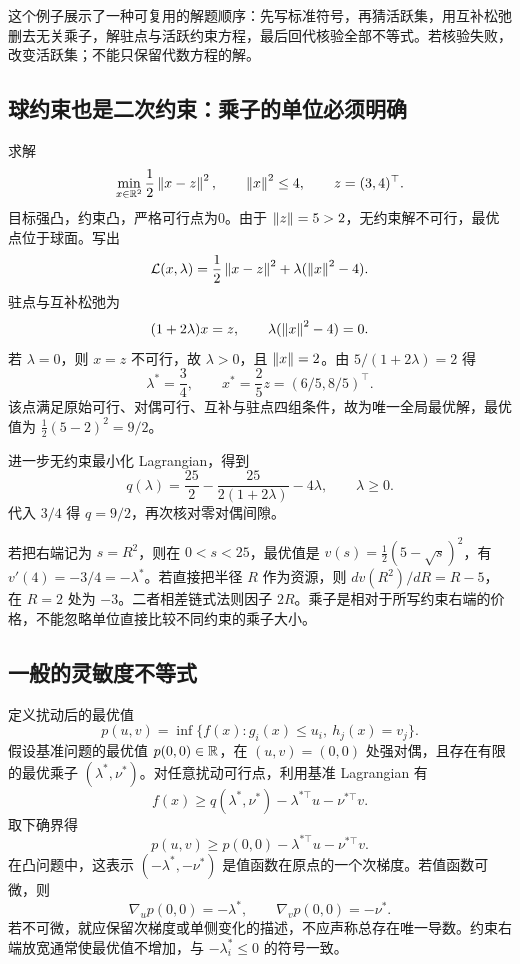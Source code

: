 这个例子展示了一种可复用的解题顺序：先写标准符号，再猜活跃集，用互补松弛删去无关乘子，解驻点与活跃约束方程，最后回代核验全部不等式。若核验失败，改变活跃集；不能只保留代数方程的解。

\subsection{球约束也是二次约束：乘子的单位必须明确}

\begin{example}
\label{l2:ex-ball}
求解
\[
 \min_{x\in\mathbb R^2}\frac12\left\lVert x-z\right\rVert^2,
 \qquad \left\lVert x\right\rVert^2\leq4,\qquad z=(3,4)^\top.
\]
目标强凸，约束凸，严格可行点为0。由于 $\left\lVert z\right\rVert=5>2$，无约束解不可行，最优点位于球面。写出
\[
 \mathcal L(x,\lambda)=\frac12\left\lVert x-z\right\rVert^2
                         +\lambda(\left\lVert x\right\rVert^2-4).
\]
驻点与互补松弛为
\[
 (1+2\lambda)x=z,
 \qquad \lambda(\left\lVert x\right\rVert^2-4)=0.
\]
若 $\lambda=0$，则 $x=z$ 不可行，故 $\lambda>0$，且 $\left\lVert x\right\rVert=2$。由 $5/(1+2\lambda)=2$ 得
\[
 \lambda^*=\frac34,\qquad x^*=\frac25z=(6/5,8/5)^\top.
\]
该点满足原始可行、对偶可行、互补与驻点四组条件，故为唯一全局最优解，最优值为 $\tfrac12(5-2)^2=9/2$。

进一步无约束最小化 Lagrangian，得到
\[
 q(\lambda)=\frac{25}{2}-\frac{25}{2(1+2\lambda)}-4\lambda,
 \qquad\lambda\geq0.
\]
代入 $3/4$ 得 $q=9/2$，再次核对零对偶间隙。

若把右端记为 $s=R^2$，则在 $0<s<25$，最优值是 $v(s)=\tfrac12(5-\sqrt s)^2$，有 $v'(4)=-3/4=-\lambda^*$。若直接把半径 $R$ 作为资源，则 $d v(R^2)/dR=R-5$，在 $R=2$ 处为 $-3$。二者相差链式法则因子 $2R$。乘子是相对于所写约束右端的价格，不能忽略单位直接比较不同约束的乘子大小。
\end{example}

\subsection{一般的灵敏度不等式}

定义扰动后的最优值
\[
 p(u,v)=\inf\{f(x):g_i(x)\leq u_i,\ h_j(x)=v_j\}.
\]
假设基准问题的最优值 $p(0,0)\in\mathbb R$，在 $(u,v)=(0,0)$ 处强对偶，且存在有限的最优乘子 $(\lambda^*,\nu^*)$。对任意扰动可行点，利用基准 Lagrangian 有
\[
 f(x)\geq q(\lambda^*,\nu^*)
                -\lambda^{*\top}u-\nu^{*\top}v.
\]
取下确界得
\begin{equation}
 p(u,v)\geq p(0,0)-\lambda^{*\top}u-\nu^{*\top}v.
 \label{l2:sensitivity-bound}
\end{equation}
在凸问题中，这表示 $(-\lambda^*,-\nu^*)$ 是值函数在原点的一个次梯度。若值函数可微，则
\[
 \nabla_u p(0,0)=-\lambda^*,\qquad
 \nabla_v p(0,0)=-\nu^*.
\]
若不可微，就应保留次梯度或单侧变化的描述，不应声称总存在唯一导数。约束右端放宽通常使最优值不增加，与 $-\lambda_i^*\leq0$ 的符号一致。

